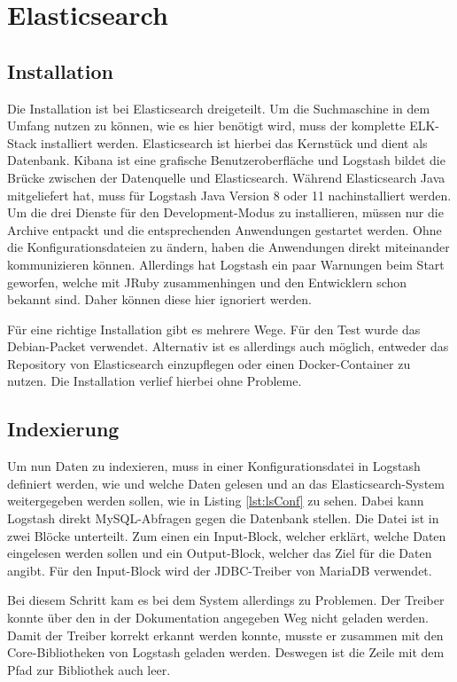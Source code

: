 
\section{Elasticsearch}

\subsection{Installation}

Die Installation ist bei Elasticsearch dreigeteilt. Um die Suchmaschine in dem Umfang nutzen zu können, wie es hier benötigt wird, muss der komplette ELK-Stack installiert werden. Elasticsearch ist hierbei das Kernstück und dient als Datenbank. Kibana ist eine grafische Benutzeroberfläche und Logstash bildet die Brücke zwischen der Datenquelle und Elasticsearch. Während Elasticsearch Java mitgeliefert hat, muss für Logstash Java Version 8 oder 11 nachinstalliert werden. Um die drei Dienste für den Development-Modus zu installieren, müssen nur die Archive entpackt und die entsprechenden Anwendungen gestartet werden. Ohne die Konfigurationsdateien zu ändern, haben die Anwendungen direkt miteinander kommunizieren können. Allerdings hat Logstash ein paar Warnungen beim Start geworfen, welche mit JRuby zusammenhingen und den Entwicklern schon bekannt sind. Daher können diese hier ignoriert werden.

Für eine richtige Installation gibt es mehrere Wege. Für den Test wurde das Debian-Packet verwendet. Alternativ ist es allerdings auch möglich, entweder das Repository von Elasticsearch einzupflegen oder einen Docker-Container zu nutzen. Die Installation verlief hierbei ohne Probleme.

\subsection{Indexierung}
\label{elaVgl:index}

Um nun Daten zu indexieren, muss in einer Konfigurationsdatei in Logstash definiert werden, wie und welche Daten gelesen und an das Elasticsearch-System weitergegeben werden sollen, wie in Listing \ref{lst:lsConf} zu sehen. Dabei kann Logstash direkt MySQL-Abfragen gegen die Datenbank stellen. Die Datei ist in zwei Blöcke unterteilt. Zum einen ein Input-Block, welcher erklärt, welche Daten eingelesen werden sollen und ein Output-Block, welcher das Ziel für die Daten angibt. Für den Input-Block wird der JDBC-Treiber von MariaDB verwendet.

Bei diesem Schritt kam es bei dem System allerdings zu Problemen. Der Treiber konnte über den in der Dokumentation angegeben Weg nicht geladen werden. Damit der Treiber korrekt erkannt werden konnte, musste er zusammen mit den Core-Bibliotheken von Logstash geladen werden. Deswegen ist die Zeile mit dem Pfad zur Bibliothek auch leer. 

